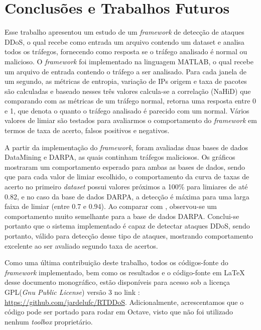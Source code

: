 \chapter[Conclusões e Trabalhos Futuros]{Conclusões e Trabalhos Futuros}
Esse trabalho apresentou um estudo de um \textit{framework} de detecção de ataques DDoS, o qual recebe como entrada um arquivo contendo um dataset e analisa todos os tráfegos, fornecendo como resposta se o tráfego analisado é normal ou malicioso. O \textit{framework} foi implementado na linguagem MATLAB, o qual recebe um arquivo de entrada contendo o tráfego a ser analisado. Para cada janela de um segundo, as métricas de entropia, variação de IPs origem e taxa de pacotes são calculadas e baseado nesses três valores  calcula-se a correlação (NaHiD) que comparando com as métricas de um tráfego normal, retorna uma resposta entre 0 e 1, que denota o quanto o tráfego analisado é parecido com um normal. Vários valores de limiar são testados para avaliarmos o comportamento do \textit{framework} em termos de taxa de acerto, falsos positivos e negativos.

A partir da implementação do \textit{framework}, foram avaliadas duas bases de dados DataMining e DARPA, as quais continham tráfegos maliciosos. Os gráficos mostraram um comportamento esperado para ambas as bases de dados, sendo que para cada valor de limiar escolhido, o comportamento da curva de taxas de acerto no primeiro \textit{dataset} possui valores próximos a 100\% para limiares de até 0.82, e no caso da base de dados DARPA, a detecção é máxima para uma larga faixa de limiar (entre 0.7 e 0.94). Ao comparar com \cite{HOQUE201748}, observou-se um comportamento muito semelhante para a base de dados DARPA. Conclui-se portanto que o sistema implementado é capaz de detectar ataques DDoS, sendo portanto, válido para detecção desse tipo de ataques, mostrando comportamento excelente ao ser avaliado segundo taxa de acertos. 

Como uma última contribuição deste trabalho, todos os códigos-fonte do \textit{framework} implementado, bem como os resultados e o código-fonte em \LaTeX \hspace{0.01cm} desse documento monográfico, estão disponíveis para acesso sob a licença GPL(\textit{Gnu Public License}) versão 3 no link : \url{https://github.com/jardelufc/RTDDoS}. Adicionalmente, acrescentamos que o código pode ser portado para rodar em Octave, visto que não foi utilizado nenhum \textit{toolbox} proprietário.   

